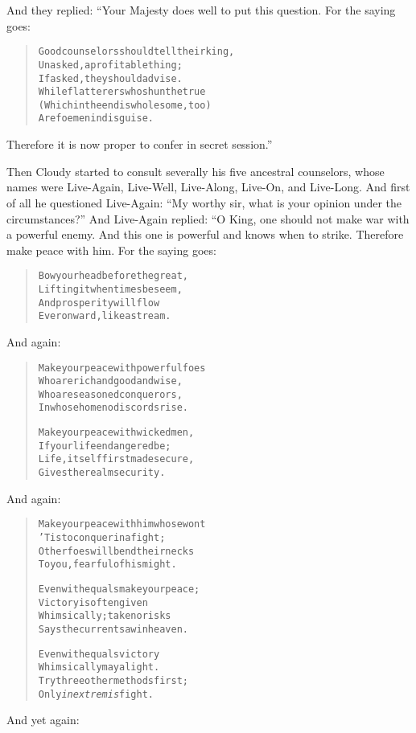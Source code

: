 \documentclass[article, twoside, 14pt]{memoir}
\renewenvironment{verbatim}{%
\begin{quote}%
\vskip -10pt%
\begin{alltt}\normalfont\large}{\end{alltt}%
\end{quote}%
\vskip -10pt
} %
\begin{document}
And they replied: “Your Majesty does well to put this question. For
the saying goes:

\begin{verbatim}
Good counselors should tell their king,
Unasked, a profitable thing;
    If asked, they should advise.
While flatterers who shun the true
(Which in the end is wholesome, too)
    Are foemen in disguise.
\end{verbatim}
Therefore it is now proper to confer in secret session.”

Then Cloudy started to consult severally his five ancestral
counselors, whose names were Live-Again, Live-Well, Live-Along,
Live-On, and Live-Long. And first of all he questioned Live-Again:
``My worthy sir, what is your opinion under the circumstances?''
And Live-Again replied: “O King, one should not make war with a
powerful enemy. And this one is powerful and knows when to strike.
Therefore make peace with him. For the saying goes:

\begin{verbatim}
Bow your head before the great,
    Lifting it when times beseem,
And prosperity will flow
    Ever onward, like a stream.
\end{verbatim}
And again:

\begin{verbatim}
Make your peace with powerful foes
    Who are rich and good and wise,
Who are seasoned conquerors,
In whose home no discords rise.

Make your peace with wicked men,
    If your life endangered be;
Life, itself first made secure,
    Gives the realm security.
\end{verbatim}
And again:

\begin{verbatim}
Make your peace with him whose wont
    'Tis to conquer in a fight;
Other foes will bend their necks
    To you, fearful of his might.

Even with equals make your peace;
    Victory is often given
Whimsically; take no risks{\textemdash}
    Says the current saw in heaven.

Even with equals victory
    Whimsically may alight.
Try three other methods first;
    Only \emph{in extremis} fight.
\end{verbatim}
And yet again:
\end{document}
